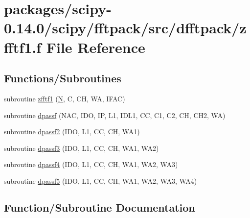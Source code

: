 \hypertarget{zfftf1_8f}{}\section{packages/scipy-\/0.14.0/scipy/fftpack/src/dfftpack/zfftf1.f File Reference}
\label{zfftf1_8f}
\subsection*{Functions/\+Subroutines}
\begin{DoxyCompactItemize}
\item 
subroutine \hyperlink{zfftf1_8f_abefc4bb9377e6bbbbf66c7692dcdf6f3}{zfftf1} (\hyperlink{polmisc_8c_a0240ac851181b84ac374872dc5434ee4}{N}, C, C\+H, W\+A, I\+F\+A\+C)
\item 
subroutine \hyperlink{zfftf1_8f_a8ad230fb964ec6efff944ace88a68240}{dpassf} (N\+A\+C, I\+D\+O, I\+P, L1, I\+D\+L1, C\+C, C1, C2, C\+H, C\+H2, W\+A)
\item 
subroutine \hyperlink{zfftf1_8f_a13d884b1311f1edfbb6e71e172d0ba26}{dpassf2} (I\+D\+O, L1, C\+C, C\+H, W\+A1)
\item 
subroutine \hyperlink{zfftf1_8f_a8eb4ff1245af8c665bfe4f79a98b48f4}{dpassf3} (I\+D\+O, L1, C\+C, C\+H, W\+A1, W\+A2)
\item 
subroutine \hyperlink{zfftf1_8f_a4e4b63d576099cea5833e5ea8a819320}{dpassf4} (I\+D\+O, L1, C\+C, C\+H, W\+A1, W\+A2, W\+A3)
\item 
subroutine \hyperlink{zfftf1_8f_ad38e1dce0ae0377ee5627bfec055c7dd}{dpassf5} (I\+D\+O, L1, C\+C, C\+H, W\+A1, W\+A2, W\+A3, W\+A4)
\end{DoxyCompactItemize}


\subsection{Function/\+Subroutine Documentation}
\hypertarget{zfftf1_8f_a8ad230fb964ec6efff944ace88a68240}{}
